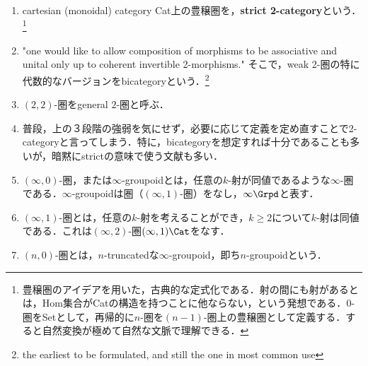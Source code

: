 \documentclass[uplatex,dvipdfmx]{jsreport}
\begin{document}
\begin{definition}\mbox{}
    \begin{enumerate}
        \item cartesian (monoidal) category Cat上の豊穣圏を，\textbf{strict 2-category}という．\footnote{豊穣圏のアイデアを用いた，古典的な定式化である．射の間にも射があるとは，Hom集合がCatの構造を持つことに他ならない，という発想である．$0$-圏をSetとして，再帰的に$n$-圏を$(n-1)$-圏上の豊穣圏として定義する．すると自然変換が極めて自然な文脈で理解できる．}
        \item "one would like to allow composition of morphisms to be associative and unital only up to coherent invertible 2-morphisms." そこで，weak 2-圏の特に代数的なバージョンをbicategoryという．\footnote{the earliest to be formulated, and still the one in most common use}
        \item $(2,2)$-圏をgeneral $2$-圏と呼ぶ．
        \item 普段，上の３段階の強弱を気にせず，必要に応じて定義を定め直すことで2-categoryと言ってしまう．特に，bicategoryを想定すれば十分であることも多いが，暗黙にstrictの意味で使う文献も多い．
        \item $(\infty,0)$-圏，または$\infty$-groupoidとは，任意の$k$-射が同値であるような$\infty$-圏である．$\infty$-groupoidは圏（$(\infty,1)$-圏）をなし，$\infty\Grpd$と表す．
        \item $(\infty,1)$-圏とは，任意の$k$-射を考えることができ，$k\ge 2$について$k$-射は同値である．これは$(\infty,2)$-圏$(\infty,1)\Cat$をなす．
        \item $(n,0)$-圏とは，$n$-truncatedな$\infty$-groupoid，即ち$n$-groupoidという．
    \end{enumerate}
\end{definition}
\end{document}
